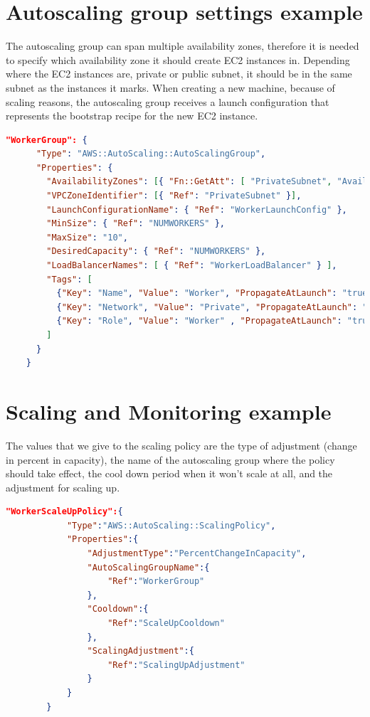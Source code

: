 \documentclass{acm_proc_article-sp}
\begin{document}
\section{Autoscaling group settings example}
\label{app:exWg}
The autoscaling group can span multiple availability zones, therefore it is needed to specify which availability zone it should create EC2 instances in. 
Depending where the EC2 instances are, private or public subnet, it should be in the same subnet as the instances it marks. 
When creating a new machine, because of scaling reasons, the autoscaling group receives a launch configuration that represents the bootstrap recipe for the new EC2 instance. 

\begin{lstlisting}[language=json,firstnumber=1]
"WorkerGroup": {
      "Type": "AWS::AutoScaling::AutoScalingGroup",
      "Properties": {
        "AvailabilityZones": [{ "Fn::GetAtt": [ "PrivateSubnet", "AvailabilityZone" ] }],
        "VPCZoneIdentifier": [{ "Ref": "PrivateSubnet" }],
        "LaunchConfigurationName": { "Ref": "WorkerLaunchConfig" },
        "MinSize": { "Ref": "NUMWORKERS" },
        "MaxSize": "10",
        "DesiredCapacity": { "Ref": "NUMWORKERS" },
        "LoadBalancerNames": [ { "Ref": "WorkerLoadBalancer" } ],
        "Tags": [
          {"Key": "Name", "Value": "Worker", "PropagateAtLaunch": "true" },
          {"Key": "Network", "Value": "Private", "PropagateAtLaunch": "true" },
          {"Key": "Role", "Value": "Worker" , "PropagateAtLaunch": "true" }
        ]
      }
    }

\end{lstlisting}

\section{Scaling and Monitoring example}
\label{app:exSM}
The values that we give to the scaling policy are the type of adjustment (change in percent in capacity), the name of the autoscaling group where the policy should take effect, the cool down period when it won't scale at all, and the adjustment for scaling up.
\begin{lstlisting}[language=json,firstnumber=1]
"WorkerScaleUpPolicy":{
            "Type":"AWS::AutoScaling::ScalingPolicy",
            "Properties":{
                "AdjustmentType":"PercentChangeInCapacity",
                "AutoScalingGroupName":{
                    "Ref":"WorkerGroup"
                },
                "Cooldown":{
                    "Ref":"ScaleUpCooldown"
                },
                "ScalingAdjustment":{
                    "Ref":"ScalingUpAdjustment"
                }
            }
        }
\end{lstlisting}
\end{document}
